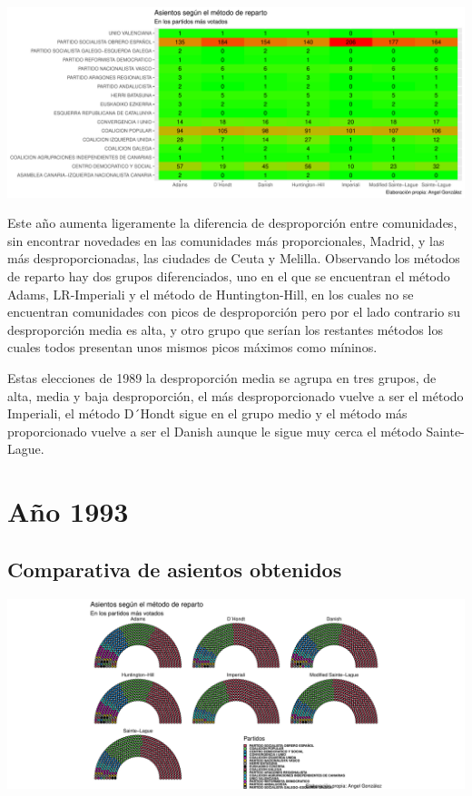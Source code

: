 \documentclass[12pt,a4paper,]{book}
\numberwithin{dummy}{section}
\theoremstyle{ocrenumbox}
\theoremstyle{blacknumex}
\theoremstyle{blacknumbox}
\theoremstyle{ocrenum}
\theoremstyle{ocrenum}
\begin{document}
\begin{center}\includegraphics[width=1\linewidth]{figurasR/unnamed-chunk-86-2} \end{center}

Este año aumenta ligeramente la diferencia de desproporción entre
comunidades, sin encontrar novedades en las comunidades más
proporcionales, Madrid, y las más desproporcionadas, las ciudades de
Ceuta y Melilla. Observando los métodos de reparto hay dos grupos
diferenciados, uno en el que se encuentran el método Adams, LR-Imperiali
y el método de Huntington-Hill, en los cuales no se encuentran
comunidades con picos de desproporción pero por el lado contrario su
desproporción media es alta, y otro grupo que serían los restantes
métodos los cuales todos presentan unos mismos picos máximos como
míninos.

Estas elecciones de 1989 la desproporción media se agrupa en tres
grupos, de alta, media y baja desproporción, el más desproporcionado
vuelve a ser el método Imperiali, el método D´Hondt sigue en el grupo
medio y el método más proporcionado vuelve a ser el Danish aunque le
sigue muy cerca el método Sainte-Lague.

\hypertarget{auxf1o-1993}{%
\section{Año 1993}\label{auxf1o-1993}}

\hypertarget{comparativa-de-asientos-obtenidos-5}{%
\subsection{Comparativa de asientos
obtenidos}\label{comparativa-de-asientos-obtenidos-5}}

\begin{center}\includegraphics[width=1\linewidth]{figurasR/unnamed-chunk-88-1} \end{center}
\end{document}
